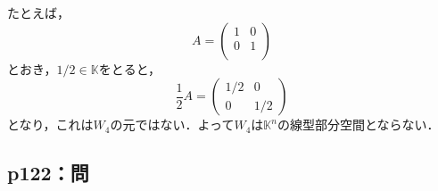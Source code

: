 \documentclass[uplatex,dvipdfmx,a4paper,10pt,fleqn]{jsarticle}
\begin{document}
\begin{leftbar}
\begin{description}
        たとえば，
        \[ 
            A= \begin{pmatrix} 1 & 0 \\ 0 & 1 \\ \end{pmatrix}
        \]
        とおき，$ 1/2 \in \mathbb{K}$をとると，
        \[
            \frac{1}{2} A = \begin{pmatrix} 1/2 & 0 \\ 0 & 1/2 \end{pmatrix}
        \]
        となり，これは$W_4$の元ではない．よって$W_4$は$\mathbb{K}^n$の線型部分空間とならない．
    \end{description}
\end{leftbar}
\newpage 

\subsection*{p122：問}
\end{document}

